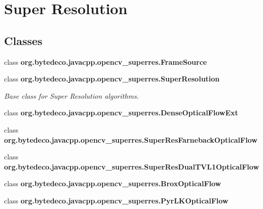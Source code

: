 \hypertarget{group__superres}{}\section{Super Resolution}
\label{group__superres}
\subsection*{Classes}
\begin{DoxyCompactItemize}
\item 
class {\bfseries org.\+bytedeco.\+javacpp.\+opencv\+\_\+superres.\+Frame\+Source}
\item 
class {\bfseries org.\+bytedeco.\+javacpp.\+opencv\+\_\+superres.\+Super\+Resolution}
\begin{DoxyCompactList}\small\item\em Base class for Super Resolution algorithms. \end{DoxyCompactList}\item 
class {\bfseries org.\+bytedeco.\+javacpp.\+opencv\+\_\+superres.\+Dense\+Optical\+Flow\+Ext}
\item 
class {\bfseries org.\+bytedeco.\+javacpp.\+opencv\+\_\+superres.\+Super\+Res\+Farneback\+Optical\+Flow}
\item 
class {\bfseries org.\+bytedeco.\+javacpp.\+opencv\+\_\+superres.\+Super\+Res\+Dual\+T\+V\+L1\+Optical\+Flow}
\item 
class {\bfseries org.\+bytedeco.\+javacpp.\+opencv\+\_\+superres.\+Brox\+Optical\+Flow}
\item 
class {\bfseries org.\+bytedeco.\+javacpp.\+opencv\+\_\+superres.\+Pyr\+L\+K\+Optical\+Flow}
\end{DoxyCompactItemize}
